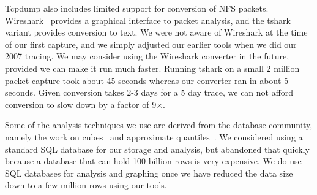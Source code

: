 
Tcpdump also includes limited support for conversion of NFS packets.
Wireshark~\cite{wireshark} provides a graphical interface to packet
analysis, and the tshark variant provides conversion to text.  We were
not aware of Wireshark at the time of our first capture, and we simply
adjusted our earlier tools when we did our 2007 tracing.  We may
consider using the Wireshark converter in the future, provided we can
make it run much faster.  Running tshark on a small 2 million packet
capture took about 45 seconds whereas our converter ran in about 5
seconds.  Given conversion takes 2-3 days for a 5 day trace, we can not
afford conversion to slow down by a factor of 9$\times$.

Some of the analysis techniques we use are derived from the database
community, namely the work on cubes~\cite{gray97cube} and approximate
quantiles~\cite{Manku98approximatemedians}.  We considered using a
standard SQL database for our storage and analysis, but abandoned that
quickly because a database that can hold 100 billion rows is
very expensive.  We do use SQL databases for analysis and graphing
once we have reduced the data size down to a few million rows using
our tools.




